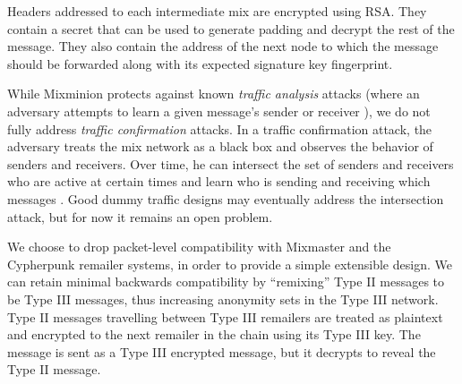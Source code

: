 \documentclass[11pt]{IEEEtran}
\begin{document}

Headers addressed to each intermediate mix are encrypted using RSA.
They contain a secret 
that can be used to generate padding and decrypt the rest
of the message. They also contain the address of the next node to 
which the message should be forwarded along with its expected signature 
key fingerprint.



While Mixminion protects against known \emph{traffic analysis} attacks
(where an adversary attempts to learn a given message's sender or
receiver \cite{rackoff93cryptographic}\cite{raymond00}), we do not fully
address \emph{traffic confirmation} attacks. In a traffic confirmation
attack, the adversary treats the mix network as a black box and
observes the behavior of senders and receivers. Over time, he can
intersect the set of senders and receivers who are active at certain
times and learn who is sending and receiving which messages
\cite{langos02}. Good dummy traffic designs may eventually address the
intersection attack, but for now it remains an open problem.

We choose to drop packet-level compatibility with Mixmaster and the
Cypherpunk remailer systems, in order to provide a simple extensible
design. We can retain minimal backwards compatibility by ``remixing''
Type II messages to be Type III messages, thus increasing anonymity
sets in the Type III network. Type II messages travelling between
Type III remailers are treated
as plaintext and encrypted to the next remailer in the chain using its
Type III key. The message is sent as a Type III encrypted message, but
it decrypts to reveal the Type II message.
\end{document}
